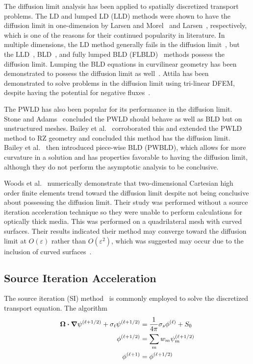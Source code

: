 \documentclass{article}
\begin{document}
The diffusion limit analysis has been applied to spatially discretized transport problems. The LD and lumped LD (LLD) methods were shown to have the diffusion limit in one-dimension by Larsen and Morel~\cite{LarsenAsymptotic} and Larsen~\cite{LarsenAsymptoticDiffusionLimit}, respectively, which is one of the reasons for their continued popularity in literature. In multiple dimensions, the LD method generally fails in the diffusion limit~\cite{BorgersAsymptoticDiffLimit}, but the LLD~\cite{MorelLLDrz, MorelLLDTetrahedral}, BLD~\cite{Adams_Disc_FEM_Thick_Diff}, and fully lumped BLD (FLBLD)~\cite{AdamsDFEMDiffLimit} methods possess the diffusion limit. Lumping the BLD equations in curvilinear geometry has been demonstrated to possess the diffusion limit as well~\cite{PalmerCurvilinearTransport, MorelLBLD}. Attila has been demonstrated to solve problems in the diffusion limit using tri-linear DFEM, despite having the potential for negative fluxes~\cite{AttilaUsersManual}.

The PWLD has also been popular for its performance in the diffusion limit. Stone and Adams~\cite{StonePLFEM} concluded the PWLD should behave as well as BLD but on unstructured meshes. Bailey et al.~\cite{BaileyDFEMCylindrical, BaileyDissertation} corroborated this and extended the PWLD method to RZ geometry and concluded this method has the diffusion limit. Bailey et al.~\cite{BaileyBLDFEM} then introduced piece-wise BLD (PWBLD), which allows for more curvature in a solution and has properties favorable to having the diffusion limit, although they do not perform the asymptotic analysis to be conclusive.

Woods et al.~\cite{WoodsHoDgfemXyCurved} numerically demonstrate that two-dimensional Cartesian high order finite elements trend toward the diffusion limit despite not being conclusive about possessing the diffusion limit. Their study was performed without a source iteration acceleration technique so they were unable to perform calculations for optically thick media. This was performed on a quadrilateral mesh with curved surfaces. Their results indicated their method may converge toward the diffusion limit at $O(\varepsilon)$ rather than $O(\varepsilon^2)$, which was suggested may occur due to the inclusion of curved surfaces~\cite{Adams_Disc_FEM_Thick_Diff}.


\subsection{Source Iteration Acceleration}
The source iteration (SI) method~\cite{Lewis_Comp_Methods_Neu_Trans} is commonly employed to solve the discretized transport equation. The algorithm
\begin{subequations}
\begin{flalign}
\bm{\Omega} \bm{\cdot} \bm{\nabla} \psi^{(\ell+1/2)} + \sigma_t \psi^{(\ell+1/2)} & = \frac{1}{4 \pi} \sigma_s \phi^{(\ell)} + S_0 \\
\phi^{(\ell+1/2)} & = \sum_m w_m \psi^{(\ell+1/2)}_m \\
\phi^{(\ell+1)} & = \phi^{(\ell+1/2)}
\end{flalign}
\label{eqs:SourceIteration}
\end{subequations}
\end{document}

